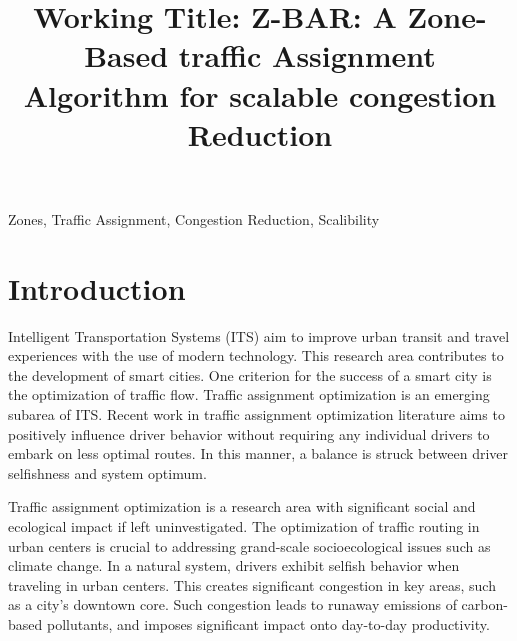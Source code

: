 \documentclass[conference]{IEEEtran}
\begin{document}
\raggedbottom

\title{Working Title: Z-BAR: A Zone-Based traffic Assignment Algorithm for scalable congestion Reduction}


\author{
}

\maketitle

\begin{abstract}


\end{abstract}

\begin{IEEEkeywords}
Zones, Traffic Assignment, Congestion Reduction, Scalibility
\end{IEEEkeywords}

\IEEEpeerreviewmaketitle

\section{Introduction}

Intelligent Transportation Systems (ITS) aim to improve urban transit and travel experiences with the use of modern technology. This research area contributes to the development of smart cities. One criterion for the success of a smart city is the optimization of traffic flow. Traffic assignment optimization is an emerging subarea of ITS. Recent work in traffic assignment optimization literature aims to positively influence driver behavior without requiring any individual drivers to embark on less optimal routes. In this manner, a balance is struck between driver selfishness and system optimum.

Traffic assignment optimization is a research area with significant social and ecological impact if left uninvestigated. The optimization of traffic routing in urban centers is crucial to addressing grand-scale socioecological issues such as climate change. In a natural system, drivers exhibit selfish behavior when traveling in urban centers. This creates significant congestion in key areas, such as a city's downtown core. Such congestion leads to runaway emissions of carbon-based pollutants, and imposes significant impact onto day-to-day productivity.
\end{document}
